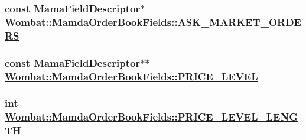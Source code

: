 \hypertarget{classWombat_1_1MamdaOrderBookFields_d2610afd35e8db866d7ff8c2f5edcaa5}{
\subsubsection[ASK\_\-MARKET\_\-ORDERS]{\setlength{\rightskip}{0pt plus 5cm}const Mama\-Field\-Descriptor$\ast$ \hyperlink{classWombat_1_1MamdaOrderBookFields_d2610afd35e8db866d7ff8c2f5edcaa5}{Wombat::Mamda\-Order\-Book\-Fields::ASK\_\-MARKET\_\-ORDERS}}}
\label{classWombat_1_1MamdaOrderBookFields_d2610afd35e8db866d7ff8c2f5edcaa5}


\hypertarget{classWombat_1_1MamdaOrderBookFields_e6d95a7d462349a2ebccb2d935fbb4de}{
\subsubsection[PRICE\_\-LEVEL]{\setlength{\rightskip}{0pt plus 5cm}const Mama\-Field\-Descriptor$\ast$$\ast$ \hyperlink{classWombat_1_1MamdaOrderBookFields_e6d95a7d462349a2ebccb2d935fbb4de}{Wombat::Mamda\-Order\-Book\-Fields::PRICE\_\-LEVEL}}}
\label{classWombat_1_1MamdaOrderBookFields_e6d95a7d462349a2ebccb2d935fbb4de}


\hypertarget{classWombat_1_1MamdaOrderBookFields_51723ea73bbad34192da9acb662806c2}{
\subsubsection[PRICE\_\-LEVEL\_\-LENGTH]{\setlength{\rightskip}{0pt plus 5cm}int \hyperlink{classWombat_1_1MamdaOrderBookFields_51723ea73bbad34192da9acb662806c2}{Wombat::Mamda\-Order\-Book\-Fields::PRICE\_\-LEVEL\_\-LENGTH}}}
\label{classWombat_1_1MamdaOrderBookFields_51723ea73bbad34192da9acb662806c2}


